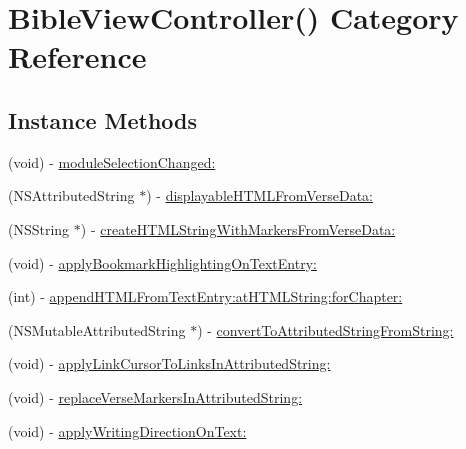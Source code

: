 \hypertarget{category_bible_view_controller_07_08}{\section{Bible\-View\-Controller() Category Reference}
\label{category_bible_view_controller_07_08}
}
\subsection*{Instance Methods}
\begin{DoxyCompactItemize}
\item 
(void) -\/ \hyperlink{category_bible_view_controller_07_08_a791ebf2a85348d6da1a7f7b3ef8cf7f7}{module\-Selection\-Changed\-:}
\item 
(N\-S\-Attributed\-String $\ast$) -\/ \hyperlink{category_bible_view_controller_07_08_a65bef65fd1e8c834fd31826c08ae9f19}{displayable\-H\-T\-M\-L\-From\-Verse\-Data\-:}
\item 
(N\-S\-String $\ast$) -\/ \hyperlink{category_bible_view_controller_07_08_a4910fdacb2836ebc3e791783a334d50d}{create\-H\-T\-M\-L\-String\-With\-Markers\-From\-Verse\-Data\-:}
\item 
(void) -\/ \hyperlink{category_bible_view_controller_07_08_a71e11b9e857380a9c2c41e5712f9d89f}{apply\-Bookmark\-Highlighting\-On\-Text\-Entry\-:}
\item 
(int) -\/ \hyperlink{category_bible_view_controller_07_08_a73d59e01dc16ef6cfd65462b0030b490}{append\-H\-T\-M\-L\-From\-Text\-Entry\-:at\-H\-T\-M\-L\-String\-:for\-Chapter\-:}
\item 
(N\-S\-Mutable\-Attributed\-String $\ast$) -\/ \hyperlink{category_bible_view_controller_07_08_a3ec0076bded9f52084996476a155d986}{convert\-To\-Attributed\-String\-From\-String\-:}
\item 
(void) -\/ \hyperlink{category_bible_view_controller_07_08_a2c830d99190c011204921813da29ba22}{apply\-Link\-Cursor\-To\-Links\-In\-Attributed\-String\-:}
\item 
(void) -\/ \hyperlink{category_bible_view_controller_07_08_a190378e719902abe956b3aacb1cbfca6}{replace\-Verse\-Markers\-In\-Attributed\-String\-:}
\item 
(void) -\/ \hyperlink{category_bible_view_controller_07_08_ac42f6a8ddbe6a437e3e0f58e80dbe5a0}{apply\-Writing\-Direction\-On\-Text\-:}
\end{DoxyCompactItemize}


